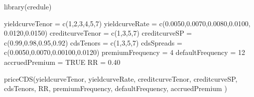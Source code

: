 \documentclass[a4paper]{book}
\begin{document}
\begin{Examples}
\begin{ExampleCode}
library(credule)

yieldcurveTenor = c(1,2,3,4,5,7)
yieldcurveRate = c(0.0050,0.0070,0.0080,0.0100, 0.0120,0.0150)
creditcurveTenor = c(1,3,5,7)
creditcurveSP = c(0.99,0.98,0.95,0.92)
cdsTenors = c(1,3,5,7)
cdsSpreads = c(0.0050,0.0070,0.00100,0.0120)
premiumFrequency = 4
defaultFrequency = 12
accruedPremium = TRUE
RR = 0.40

priceCDS(yieldcurveTenor,
            yieldcurveRate,
            creditcurveTenor,
            creditcurveSP,
            cdsTenors,
            RR,
            premiumFrequency,
            defaultFrequency,
            accruedPremium
          )
\end{ExampleCode}
\end{Examples}
\printindex{}
\end{document}
